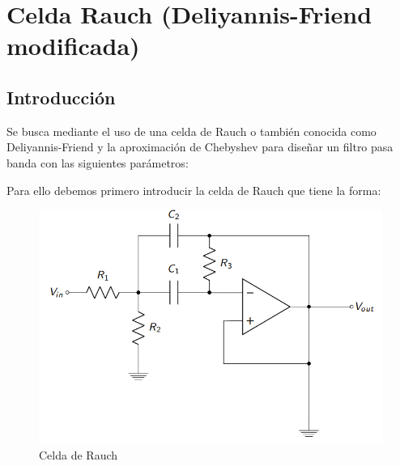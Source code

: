 \section{Celda Rauch (Deliyannis-Friend modificada)}

\subsection{Introducción}

Se busca mediante el uso de una celda de Rauch o también conocida como Deliyannis-Friend y la aproximación de Chebyshev para diseñar un filtro pasa banda con las siguientes parámetros:

\begin{table}[H]
    \centering
    \caption{Par\'ametros de diseño para el filtro a implementar}
    \label{ej22diseno}
\end{table}

Para ello debemos primero introducir la celda de Rauch que tiene la forma:

\begin{figure}[H]
    \centering
    \includegraphics[scale = 0.6]{../Ejercicio2-DisenoDeCeldas/2CELDARAUCH/Informe/circuito3.png}
    \caption{Celda de Rauch}
    \label{ej22cirbasic}
\end{figure}

